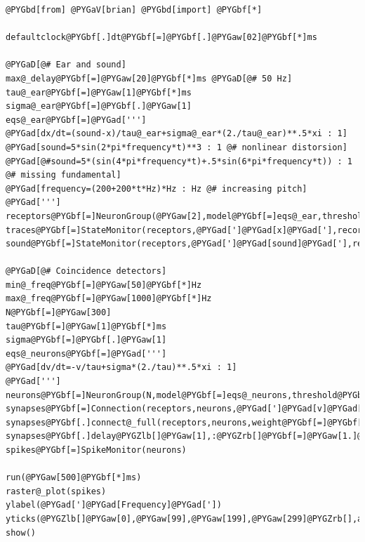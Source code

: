\documentclass[letterpaper,10pt,english]{manual}
\begin{document}
\begin{Verbatim}[commandchars=@\[\]]
@PYGbd[from] @PYGaV[brian] @PYGbd[import] @PYGbf[*]

defaultclock@PYGbf[.]dt@PYGbf[=]@PYGbf[.]@PYGaw[02]@PYGbf[*]ms

@PYGaD[@# Ear and sound]
max@_delay@PYGbf[=]@PYGaw[20]@PYGbf[*]ms @PYGaD[@# 50 Hz]
tau@_ear@PYGbf[=]@PYGaw[1]@PYGbf[*]ms
sigma@_ear@PYGbf[=]@PYGbf[.]@PYGaw[1]
eqs@_ear@PYGbf[=]@PYGad[''']
@PYGad[dx/dt=(sound-x)/tau@_ear+sigma@_ear*(2./tau@_ear)**.5*xi : 1]
@PYGad[sound=5*sin(2*pi*frequency*t)**3 : 1 @# nonlinear distorsion]
@PYGad[@#sound=5*(sin(4*pi*frequency*t)+.5*sin(6*pi*frequency*t)) : 1 @# missing fundamental]
@PYGad[frequency=(200+200*t*Hz)*Hz : Hz @# increasing pitch]
@PYGad[''']
receptors@PYGbf[=]NeuronGroup(@PYGaw[2],model@PYGbf[=]eqs@_ear,threshold@PYGbf[=]@PYGaw[1],reset@PYGbf[=]@PYGaw[0],refractory@PYGbf[=]@PYGaw[2]@PYGbf[*]ms)
traces@PYGbf[=]StateMonitor(receptors,@PYGad[']@PYGad[x]@PYGad['],record@PYGbf[=]@PYGaA[True])
sound@PYGbf[=]StateMonitor(receptors,@PYGad[']@PYGad[sound]@PYGad['],record@PYGbf[=]@PYGaw[0])

@PYGaD[@# Coincidence detectors]
min@_freq@PYGbf[=]@PYGaw[50]@PYGbf[*]Hz
max@_freq@PYGbf[=]@PYGaw[1000]@PYGbf[*]Hz
N@PYGbf[=]@PYGaw[300]
tau@PYGbf[=]@PYGaw[1]@PYGbf[*]ms
sigma@PYGbf[=]@PYGbf[.]@PYGaw[1]
eqs@_neurons@PYGbf[=]@PYGad[''']
@PYGad[dv/dt=-v/tau+sigma*(2./tau)**.5*xi : 1]
@PYGad[''']
neurons@PYGbf[=]NeuronGroup(N,model@PYGbf[=]eqs@_neurons,threshold@PYGbf[=]@PYGaw[1],reset@PYGbf[=]@PYGaw[0])
synapses@PYGbf[=]Connection(receptors,neurons,@PYGad[']@PYGad[v]@PYGad['],structure@PYGbf[=]@PYGad[']@PYGad[dense]@PYGad['],max@_delay@PYGbf[=]@PYGaw[1.1]@PYGbf[*]max@_delay,delay@PYGbf[=]@PYGaA[True])
synapses@PYGbf[.]connect@_full(receptors,neurons,weight@PYGbf[=]@PYGbf[.]@PYGaw[5])
synapses@PYGbf[.]delay@PYGZlb[]@PYGaw[1],:@PYGZrb[]@PYGbf[=]@PYGaw[1.]@PYGbf[/]exp(linspace(log(min@_freq@PYGbf[/]Hz),log(max@_freq@PYGbf[/]Hz),N))
spikes@PYGbf[=]SpikeMonitor(neurons)

run(@PYGaw[500]@PYGbf[*]ms)
raster@_plot(spikes)
ylabel(@PYGad[']@PYGad[Frequency]@PYGad['])
yticks(@PYGZlb[]@PYGaw[0],@PYGaw[99],@PYGaw[199],@PYGaw[299]@PYGZrb[],array(@PYGaw[1.]@PYGbf[/]synapses@PYGbf[.]delay@PYGbf[.]todense()@PYGZlb[]@PYGaw[1],@PYGZlb[]@PYGaw[0],@PYGaw[99],@PYGaw[199],@PYGaw[299]@PYGZrb[]@PYGZrb[],dtype@PYGbf[=]@PYGaX[int]))
show()
\end{Verbatim}

\resetcurrentobjects
\hypertarget{--doc-usermanual}{}
\end{document}
